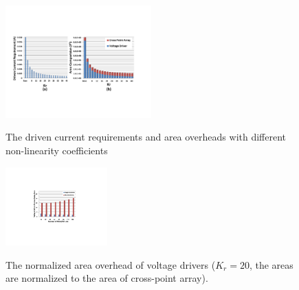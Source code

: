 %
\begin{figure}%
\centering
  \includegraphics[width=0.5\textwidth]{./figures/area_all.pdf}\\
  \vspace{-5pt}
  \caption{The driven current requirements and area overheads with different non-linearity coefficients}\label{fig:area_all}
 \vspace{-15pt}
\end{figure}


\begin{figure}%
\centering
  \includegraphics[width=0.35\textwidth]{./figures/Area_kr20.pdf}\\
  \caption{The normalized area overhead of voltage drivers ($K_r=20$, the areas are normalized to the area of cross-point array). }\label{fig:Area_kr20}
\end{figure}
